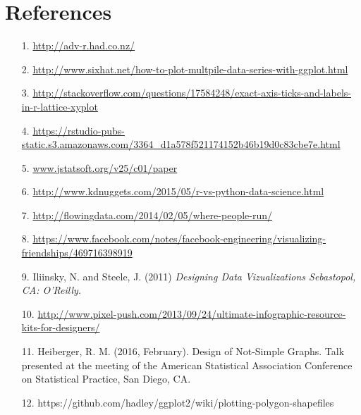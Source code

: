 \section{References}

\begin{frame}[allowframebreaks]
  \begin{itemize}
    \item[1.] \url{http://adv-r.had.co.nz/}
    \item[2.] \url{http://www.sixhat.net/how-to-plot-multpile-data-series-with-ggplot.html}
    \item[3.] \url{http://stackoverflow.com/questions/17584248/exact-axis-ticks-and-labels-in-r-lattice-xyplot}
    \item[4.] \url{https://rstudio-pubs-static.s3.amazonaws.com/3364_d1a578f521174152b46b19d0c83cbe7e.html}
    \item[5.] \url{www.jstatsoft.org/v25/c01/paper}
    \item[6.] \url{http://www.kdnuggets.com/2015/05/r-vs-python-data-science.html}
    \item[7.] \url{http://flowingdata.com/2014/02/05/where-people-run/}
    \item[8.] \url{https://www.facebook.com/notes/facebook-engineering/visualizing-friendships/469716398919}
    \item[9.] Iliinsky, N. and Steele, J. (2011) \itshape{Designing Data Vizualizations} \normalfont Sebastopol, CA: O'Reilly.
    \item[10.] \url{http://www.pixel-push.com/2013/09/24/ultimate-infographic-resource-kits-for-designers/}
    \item[11.] Heiberger, R. M. (2016, February). Design of Not-Simple Graphs. Talk presented at the 
     meeting of the American Statistical Association Conference on Statistical Practice, San Diego, CA.
     \item[12.] https://github.com/hadley/ggplot2/wiki/plotting-polygon-shapefiles
  \end{itemize}
\end{frame}



